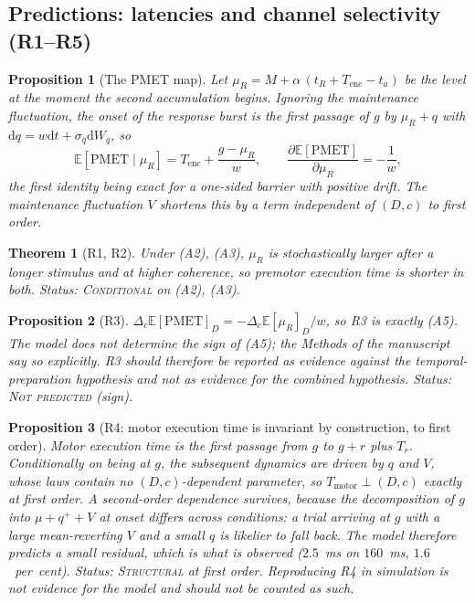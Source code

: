 \documentclass[11pt,a4paper]{article}
\newcommand{\E}{\mathbb{E}}
\newcommand{\dd}{\mathrm{d}}
\newcommand{\Mrv}{M}
\theoremstyle{plain}
\newtheorem{proposition}{Proposition}
\newtheorem{theorem}{Theorem}
\theoremstyle{remark}
\begin{document}
\subsection{Predictions: latencies and channel selectivity (R1--R5)}
\label{sec:latency}

\begin{proposition}[The PMET map]
\label{prop:pmet}
Let $\mu_R=\Mrv+\alpha\,(t_R+T_{\text{enc}}-t_a)$ be the level at the moment the second
accumulation begins. Ignoring the maintenance fluctuation, the onset of the response burst
is the first passage of $g$ by $\mu_R+q$ with $\dd q=w\dd t+\sigma_q\dd W_q$, so
\begin{equation}
\E[\text{PMET}\mid\mu_R]=T_{\text{enc}}+\frac{g-\mu_R}{w},\qquad
\frac{\partial\E[\text{PMET}]}{\partial\mu_R}=-\frac1w ,
\end{equation}
the first identity being exact for a one-sided barrier with positive drift. The
maintenance fluctuation $V$ shortens this by a term independent of $(D,c)$ to first order.
\end{proposition}

\begin{theorem}[R1, R2]
Under (A2), (A3), $\mu_R$ is stochastically larger after a longer stimulus and at higher
coherence, so premotor execution time is shorter in both.
\emph{Status: \textsc{Conditional} on (A2), (A3).}
\end{theorem}

\begin{proposition}[R3]
$\Delta_c\E[\text{PMET}]_D=-\Delta_c\E[\mu_R]_D/w$, so R3 is exactly (A5). The model does
not determine the sign of (A5); the Methods of the manuscript say so explicitly. R3 should
therefore be reported as evidence against the temporal-preparation hypothesis and not as
evidence for the combined hypothesis. \emph{Status: \textsc{Not predicted} (sign).}
\end{proposition}

\begin{proposition}[R4: motor execution time is invariant by construction, to first order]
Motor execution time is the first passage from $g$ to $g+r$ plus $T_r$. Conditionally on
being at $g$, the subsequent dynamics are driven by $q$ and $V$, whose laws contain no
$(D,c)$-dependent parameter, so $T_{\text{motor}}\perp(D,c)$ exactly at first order.
A second-order dependence survives, because the \emph{decomposition} of $g$ into
$\mu+q^{+}+V$ at onset differs across conditions: a trial arriving at $g$ with a large
mean-reverting $V$ and a small $q$ is likelier to fall back. The model therefore predicts
a small residual, which is what is observed ($2.5$~ms on $160$~ms, $1.6$~per~cent).
\emph{Status: \textsc{Structural} at first order.} Reproducing R4 in simulation is not
evidence for the model and should not be counted as such.
\end{proposition}
\end{document}
